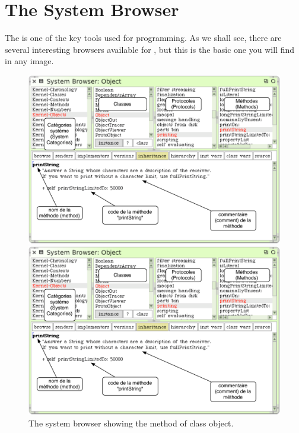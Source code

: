 \documentclass[a4paper,10pt,twoside]{book}
\begin{document}
\section{The System Browser}

The  is one of the key tools used for programming.
As we shall see, there are several interesting browsers available for \sq, but this is the basic one you will find in any image.


\begin{figure}[htb]
\ifluluelse
	{\centerline {\includegraphics[width=\textwidth]{ClassBrowser1}}}
	{\centerline {\includegraphics[scale=0.7]{ClassBrowser1}}}
\caption{The system browser showing the  method of class object.
\label{fig:classBrowser}}
\end{figure}
\end{document}
